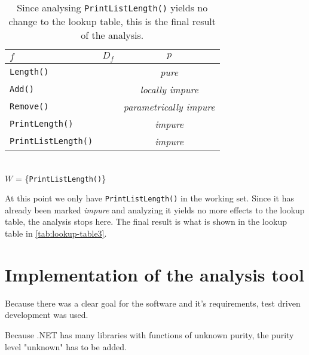 \documentclass[a4paper,12pt]{article}
\begin{document}
\begin{table}[H]
  \caption{Since analysing \texttt{PrintListLength()} yields no change to the lookup table, this is the final result of the analysis.}
  \label{tab:lookup-table3}
  \centering
  \begin{tabular}{|l|c|c|}
    \hline
    $f$                        & $D_f$                  & $p$                     \\ \hline
    \texttt{Length()}          &                        & \textit{pure}                  \\
    \texttt{Add()}             &                        & \textit{locally impure}        \\
    \texttt{Remove()}          &                        & \textit{parametrically impure} \\
    \texttt{PrintLength()}     &                        & \textit{impure}                \\
    \texttt{PrintListLength()} &                        & \textit{impure}                \\ \hline
  \end{tabular}
  \\
  $W$ = \{\texttt{PrintListLength()}\}
\end{table}

At this point we only have \texttt{PrintListLength()} in the working set. Since it has already been marked \textit{impure} and analyzing it yields no more effects to the lookup table, the analysis stops here. The final result is what is shown in the lookup table in \autoref{tab:lookup-table3}.

\section{Implementation of the analysis tool} \label{sec:Implementation of the analysis tool}


Because there was a clear goal for the software and it's requirements, test driven development was used.

Because .NET has many libraries with functions of unknown purity, the purity level "unknown" has to be added.
\end{document}
